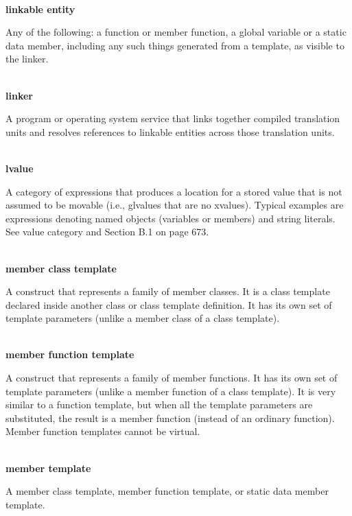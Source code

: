 \hspace*{\fill} \\ %
\noindent
\textbf{linkable entity}

Any of the following: a function or member function, a global variable or a static data member, including any such things generated from a template, as visible to the linker.

\hspace*{\fill} \\ %
\noindent
\textbf{linker}

A program or operating system service that links together compiled translation units and resolves references to linkable entities across those translation units.

\hspace*{\fill} \\ %
\noindent
\textbf{lvalue}

A category of expressions that produces a location for a stored value that is not assumed to be movable (i.e., glvalues that are no xvalues). Typical examples are expressions denoting named objects (variables or members) and string literals. See value category and Section B.1 on page 673.

\hspace*{\fill} \\ %
\noindent
\textbf{member class template}

A construct that represents a family of member classes. It is a class template declared inside another class or class template definition. It has its own set of template parameters (unlike a member class of a class template).

\hspace*{\fill} \\ %
\noindent
\textbf{member function template}

A construct that represents a family of member functions. It has its own set of template parameters (unlike a member function of a class template). It is very similar to a function template, but when all the template parameters are substituted, the result is a member function (instead of an ordinary function). Member function templates cannot be virtual.

\hspace*{\fill} \\ %
\noindent
\textbf{member template}

A member class template, member function template, or static data member template.

